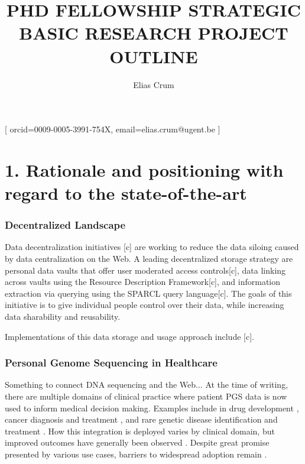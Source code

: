 \documentclass[a4paper,11pt]{article}
\begin{document}
\title{PHD FELLOWSHIP STRATEGIC BASIC RESEARCH PROJECT OUTLINE}

\author{Elias Crum}[
orcid=0009-0005-3991-754X,
email=elias.crum@ugent.be
]

\maketitle

\section{1. Rationale and positioning with regard to the state-of-the-art}
\begin{comment}
Elaborate the scientific motivation for the project proposal based on scientific knowledge gaps, and the issues and problems that you want to solve with this project. Concisely describe the related international state of the art, with reference to scientific literature. Indicate why the execution of the proposed strategic basic research is important. Position your project in relation to ongoing national and international research.
\end{comment}

\subsubsection{Decentralized Landscape}
Data decentralization initiatives [c] are working to reduce the data siloing caused by data centralization on the Web.
A leading decentralized storage strategy are personal data vaults that offer user moderated access controls[c], data linking across vaults using the Resource Description Framework[c], and information extraction via querying using the SPARCL query language[c].
The goals of this initiative is to give individual people control over their data, while increasing data sharability and reusability.

Implementations of this data storage and usage approach include [c].


\subsubsection{Personal Genome Sequencing in Healthcare}
Something to connect DNA sequencing and the Web...
At the time of writing, there are multiple domains of clinical practice where patient PGS data is now used to inform medical decision making. 
Examples include in drug development \cite{ko_new_2022}, cancer diagnosis and treatment \cite{mcleod_cancer_2013}, and rare genetic disease identification and treatment \cite{souche_recommendations_2022}.
How this integration is deployed varies by clinical domain, but improved outcomes have generally been observed \cite{mathur_personalized_2017}.
Despite great promise presented by various use cases, barriers to widespread adoption remain \cite{stefanicka-wojtas_barriers_2023}.
\end{document}

